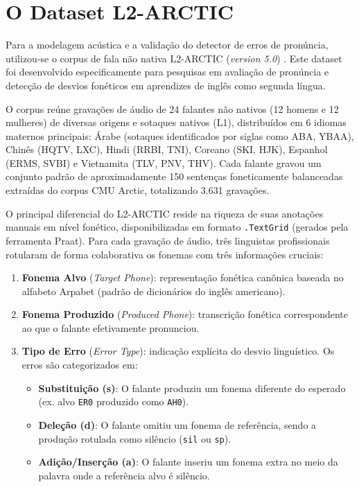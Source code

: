 \documentclass[12pt]{article}
\begin{document}
\section{O Dataset L2-ARCTIC}
Para a modelagem acústica e a validação do detector de erros de pronúncia, utilizou-se o corpus de fala não nativa L2-ARCTIC (\textit{version 5.0}) \cite{zhao2018l2}. Este dataset foi desenvolvido especificamente para pesquisas em avaliação de pronúncia e detecção de desvios fonéticos em aprendizes de inglês como segunda língua.

O corpus reúne gravações de áudio de 24 falantes não nativos (12 homens e 12 mulheres) de diversas origens e sotaques nativos (L1), distribuídos em 6 idiomas maternos principais: Árabe (sotaques identificados por siglas como ABA, YBAA), Chinês (HQTV, LXC), Hindi (RRBI, TNI), Coreano (SKI, HJK), Espanhol (ERMS, SVBI) e Vietnamita (TLV, PNV, THV). Cada falante gravou um conjunto padrão de aproximadamente 150 sentenças foneticamente balanceadas extraídas do corpus CMU Arctic, totalizando 3.631 gravações.

O principal diferencial do L2-ARCTIC reside na riqueza de suas anotações manuais em nível fonético, disponibilizadas em formato \texttt{.TextGrid} (gerados pela ferramenta Praat). Para cada gravação de áudio, três linguistas profissionais rotularam de forma colaborativa os fonemas com três informações cruciais:
\begin{enumerate}
    \item \textbf{Fonema Alvo} (\textit{Target Phone}): representação fonética canônica baseada no alfabeto Arpabet (padrão de dicionários do inglês americano).
    \item \textbf{Fonema Produzido} (\textit{Produced Phone}): transcrição fonética correspondente ao que o falante efetivamente pronunciou.
    \item \textbf{Tipo de Erro} (\textit{Error Type}): indicação explícita do desvio linguístico. Os erros são categorizados em:
    \begin{itemize}
        \item \textbf{Substituição (s)}: O falante produziu um fonema diferente do esperado (ex. alvo \texttt{ER0} produzido como \texttt{AH0}).
        \item \textbf{Deleção (d)}: O falante omitiu um fonema de referência, sendo a produção rotulada como silêncio (\texttt{sil} ou \texttt{sp}).
        \item \textbf{Adição/Inserção (a)}: O falante inseriu um fonema extra no meio da palavra onde a referência alvo é silêncio.
    \end{itemize}
\end{enumerate}
\end{document}
